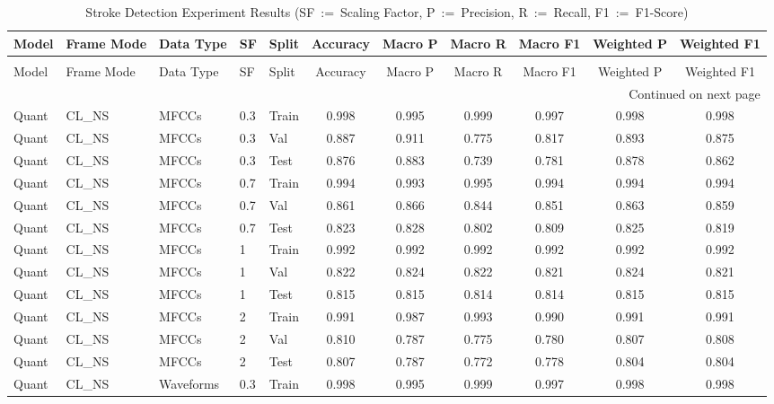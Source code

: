 \begin{landscape}
\begin{longtable}{|l|l|l|l|l|c|c|c|c|c|c|}
\caption{Stroke Detection Experiment Results (SF~:=~Scaling Factor, P~:=~Precision, R~:=~Recall, F1~:=~F1-Score)} \label{tab:Stroke_Detection_Results} \\
\toprule
Model & Frame Mode & Data Type & SF & Split & Accuracy & Macro P & Macro R & Macro F1 & Weighted P & Weighted F1 \\
\midrule
\endfirsthead
\caption[]{Stroke Detection Experiment Results (SF~:=~Scaling Factor, P~:=~Precision, R~:=~Recall, F1~:=~F1-Score)} \\
\toprule
Model & Frame Mode & Data Type & SF & Split & Accuracy & Macro P & Macro R & Macro F1 & Weighted P & Weighted F1 \\
\midrule
\endhead
\midrule
\multicolumn{11}{r}{Continued on next page} \\
\midrule
\endfoot
\bottomrule
\endlastfoot
Quant & CL\_NS & MFCCs & 0.3 & Train & 0.998 & 0.995 & 0.999 & 0.997 & 0.998 & 0.998 \\
Quant & CL\_NS & MFCCs & 0.3 & Val & 0.887 & 0.911 & 0.775 & 0.817 & 0.893 & 0.875 \\
Quant & CL\_NS & MFCCs & 0.3 & Test & 0.876 & 0.883 & 0.739 & 0.781 & 0.878 & 0.862 \\
Quant & CL\_NS & MFCCs & 0.7 & Train & 0.994 & 0.993 & 0.995 & 0.994 & 0.994 & 0.994 \\
Quant & CL\_NS & MFCCs & 0.7 & Val & 0.861 & 0.866 & 0.844 & 0.851 & 0.863 & 0.859 \\
Quant & CL\_NS & MFCCs & 0.7 & Test & 0.823 & 0.828 & 0.802 & 0.809 & 0.825 & 0.819 \\
Quant & CL\_NS & MFCCs & 1 & Train & 0.992 & 0.992 & 0.992 & 0.992 & 0.992 & 0.992 \\
Quant & CL\_NS & MFCCs & 1 & Val & 0.822 & 0.824 & 0.822 & 0.821 & 0.824 & 0.821 \\
Quant & CL\_NS & MFCCs & 1 & Test & 0.815 & 0.815 & 0.814 & 0.814 & 0.815 & 0.815 \\
Quant & CL\_NS & MFCCs & 2 & Train & 0.991 & 0.987 & 0.993 & 0.990 & 0.991 & 0.991 \\
Quant & CL\_NS & MFCCs & 2 & Val & 0.810 & 0.787 & 0.775 & 0.780 & 0.807 & 0.808 \\
Quant & CL\_NS & MFCCs & 2 & Test & 0.807 & 0.787 & 0.772 & 0.778 & 0.804 & 0.804 \\
Quant & CL\_NS & Waveforms & 0.3 & Train & 0.998 & 0.995 & 0.999 & 0.997 & 0.998 & 0.998 \\

\end{longtable}
\end{landscape}
